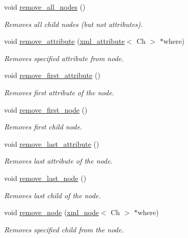 \begin{DoxyCompactItemize}
void \mbox{\hyperlink{classrapidxml_1_1xml__node_a0218147d13e41d5fa60ced4e7a7e9726}{remove\+\_\+all\+\_\+nodes}} ()
\begin{DoxyCompactList}\small\item\em Removes all child nodes (but not attributes). \end{DoxyCompactList}\item 
void \mbox{\hyperlink{classrapidxml_1_1xml__node_ac75154db2e768c0e5b541fc8cd0775ab}{remove\+\_\+attribute}} (\mbox{\hyperlink{classrapidxml_1_1xml__attribute}{xml\+\_\+attribute}}$<$ Ch $>$ $\ast$where)
\begin{DoxyCompactList}\small\item\em Removes specified attribute from node. \end{DoxyCompactList}\item 
void \mbox{\hyperlink{classrapidxml_1_1xml__node_a4eea4a7f6cb484ca9944f7eafe6e1843}{remove\+\_\+first\+\_\+attribute}} ()
\begin{DoxyCompactList}\small\item\em Removes first attribute of the node. \end{DoxyCompactList}\item 
void \mbox{\hyperlink{classrapidxml_1_1xml__node_a9a31d861e1bddc710839c551a5d2b3a4}{remove\+\_\+first\+\_\+node}} ()
\begin{DoxyCompactList}\small\item\em Removes first child node. \end{DoxyCompactList}\item 
void \mbox{\hyperlink{classrapidxml_1_1xml__node_a37d87c4d5d89fa0cf05b72ee8d4cba3b}{remove\+\_\+last\+\_\+attribute}} ()
\begin{DoxyCompactList}\small\item\em Removes last attribute of the node. \end{DoxyCompactList}\item 
void \mbox{\hyperlink{classrapidxml_1_1xml__node_a87addf2bc127ee31aa4b5295d3c9b530}{remove\+\_\+last\+\_\+node}} ()
\begin{DoxyCompactList}\small\item\em Removes last child of the node. \end{DoxyCompactList}\item 
void \mbox{\hyperlink{classrapidxml_1_1xml__node_a9316463a2201631e7e2062b17729f9cd}{remove\+\_\+node}} (\mbox{\hyperlink{classrapidxml_1_1xml__node}{xml\+\_\+node}}$<$ Ch $>$ $\ast$where)
\begin{DoxyCompactList}\small\item\em Removes specified child from the node. \end{DoxyCompactList}\item 

\end{DoxyCompactItemize}
